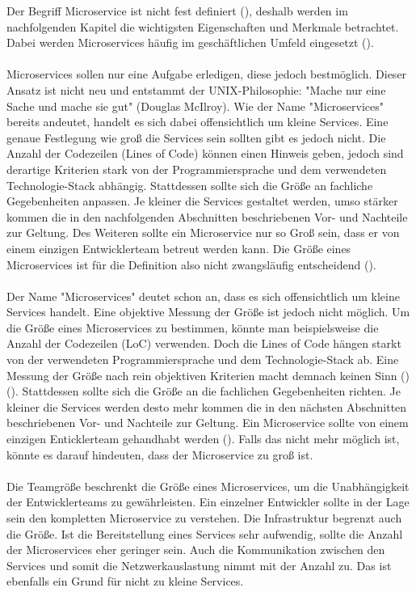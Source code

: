 Der Begriff Microservice ist nicht fest definiert (\cite[S. 2]{wolffMicroservices2018}), deshalb werden im nachfolgenden Kapitel die wichtigsten Eigenschaften und Merkmale betrachtet.
\\
Dabei werden Microservices häufig im geschäftlichen Umfeld eingesetzt (\cite[S. 15]{newmanMicroservices2015}). \\
\\
Microservices sollen nur eine Aufgabe erledigen, diese jedoch bestmöglich. Dieser Ansatz ist nicht neu und entstammt der UNIX-Philosophie: "Mache nur eine Sache und mache sie gut" (Douglas McIlroy).
Wie der Name "Microservices" bereits andeutet, handelt es sich dabei offensichtlich um kleine Services. Eine genaue Festlegung wie groß die Services sein sollten gibt es jedoch nicht. Die Anzahl der Codezeilen (Lines of Code) können einen Hinweis geben, jedoch sind derartige Kriterien stark von der Programmiersprache und dem verwendeten Technologie-Stack abhängig. Stattdessen sollte sich die Größe an fachliche Gegebenheiten anpassen. Je kleiner die Services gestaltet werden, umso stärker kommen die in den nachfolgenden Abschnitten beschriebenen Vor- und Nachteile zur Geltung. Des Weiteren sollte ein Microservice nur so Groß sein, dass er von einem einzigen Entwicklerteam betreut werden kann. Die Größe eines Microservices ist für die Definition also nicht zwangsläufig entscheidend (\cite[S. 2]{wolffMicroservices2018}). \\
\\
Der Name "Microservices" deutet schon an, dass es sich offensichtlich um kleine Services handelt.
Eine objektive Messung der Größe ist jedoch nicht möglich. Um die Größe eines Microservices zu bestimmen, könnte man beispielsweise die Anzahl der Codezeilen (LoC) verwenden. Doch die Lines of Code hängen starkt von der verwendeten Programmiersprache und dem Technologie-Stack ab. Eine Messung der Größe nach rein objektiven Kriterien macht demnach keinen Sinn (\cite[S. 31]{wolffMicroservices2018})(\cite[S. 22]{newmanMicroservices2015}). Stattdessen sollte sich die Größe an die fachlichen Gegebenheiten richten. Je kleiner die Services werden desto mehr kommen die in den nächsten Abschnitten beschriebenen Vor- und Nachteile zur Geltung. Ein Microservice sollte von einem einzigen Enticklerteam gehandhabt werden (\cite[S. 23]{newmanMicroservices2015}). Falls das nicht mehr möglich ist, könnte es darauf hindeuten, dass der Microservice zu groß ist. \\
\\
Die Teamgröße beschrenkt die Größe eines Microservices, um die Unabhängigkeit der Entwicklerteams zu gewährleisten. Ein einzelner Entwickler sollte in der Lage sein den kompletten Microservice zu verstehen. Die Infrastruktur begrenzt auch die Größe. Ist die Bereitstellung eines Services sehr aufwendig, sollte die Anzahl der Microservices eher geringer sein. Auch die Kommunikation zwischen den Services und somit die Netzwerkauslastung nimmt mit der Anzahl zu. Das ist ebenfalls ein Grund für nicht zu kleine Services.
